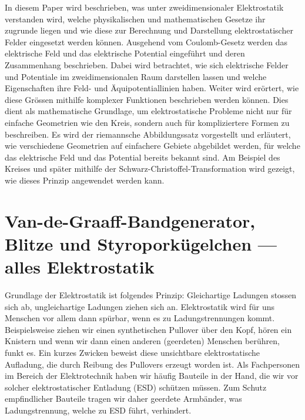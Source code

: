 %
%
%
%
\noindent
In diesem Paper wird beschrieben, was unter zweidimensionaler Elektrostatik verstanden wird, welche physikalischen und mathematischen Gesetze ihr zugrunde liegen und wie diese zur Berechnung und Darstellung elektrostatischer Felder eingesetzt werden können.
Ausgehend vom Coulomb-Gesetz werden das elektrische Feld und das elektrische Potential eingeführt und deren Zusammenhang beschrieben. 
%
Dabei wird betrachtet, wie sich elektrische Felder und Potentiale im zweidimensionalen Raum darstellen lassen und welche Eigenschaften ihre Feld- und Äquipotentiallinien haben.
Weiter wird erörtert, wie diese Grössen mithilfe komplexer Funktionen beschrieben werden können. 
Dies dient als mathematische Grundlage, um elektrostatische Probleme nicht nur für einfache Geometrien wie den Kreis, sondern auch für kompliziertere Formen zu beschreiben.
Es wird der riemannsche Abbildungssatz vorgestellt und erläutert, wie verschiedene Geometrien auf einfachere Gebiete abgebildet werden, für welche das elektrische Feld und das Potential bereits bekannt sind. 
%
%
Am Beispiel des Kreises und später mithilfe der Schwarz-Christoffel-Transformation wird gezeigt, wie dieses Prinzip angewendet werden kann.
%

\section{Van-de-Graaff-Bandgenerator, Blitze und Styroporkügelchen --- alles Elektrostatik}
%
Grundlage der Elektrostatik ist folgendes Prinzip:
Gleichartige Ladungen stossen sich ab, ungleichartige Ladungen ziehen sich an.
Elektrostatik wird für uns Menschen vor allem dann spürbar, wenn es zu Ladungstrennungen kommt.
Beispielsweise ziehen wir einen synthetischen Pullover über den Kopf, hören ein Knistern und wenn wir dann einen anderen (geerdeten) Menschen berühren, funkt es.
Ein kurzes Zwicken beweist diese unsichtbare elektrostatische Aufladung, die durch Reibung des Pullovers erzeugt worden ist.
Als Fachpersonen im Bereich der Elektrotechnik haben wir häufig Bauteile in der Hand, die wir vor solcher elektrostatischer Entladung (ESD) schützen müssen.
%
%
Zum Schutz empfindlicher Bauteile tragen wir daher geerdete Armbänder, was Ladungstrennung, welche zu ESD führt, verhindert. 

